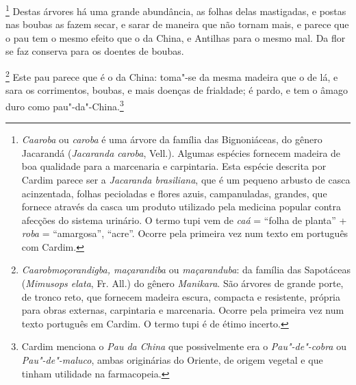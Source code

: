 \begin{linenumbers}
\footnote{ \textit{Caaroba} ou \textit{caroba} é
uma árvore da família das Bignoniáceas, do gênero Jacarandá
(\textit{Jacaranda caroba}, Vell.). Algumas espécies fornecem madeira
de boa qualidade para a marcenaria e carpintaria. Esta espécie descrita
por Cardim parece ser a \textit{Jacaranda brasiliana}, que é um pequeno
arbusto de casca acinzentada, folhas pecioladas e flores azuis,
campanuladas, grandes, que fornece através da casca um produto
utilizado pela medicina popular contra afecções do sistema urinário. O
termo tupi vem de \textit{caá} = ``folha de planta'' + \textit{roba} = ``amargosa'', 
``acre''. Ocorre pela primeira vez num texto em português com
Cardim.} Destas árvores há uma grande abundância, as folhas
delas mastigadas, e postas nas boubas as fazem secar, e sarar de
maneira que não tornam mais, e parece que o pau tem o mesmo efeito que
o da China, e Antilhas para o mesmo mal. Da flor se faz conserva para
os doentes de boubas.

\footnote{ \textit{Caarobmoçorandigba,
maçarandiba} ou \textit{maçaranduba}: da família das Sapotáceas
(\textit{Mimusops elata}, Fr. All.) do gênero \textit{Manikara}. São
árvores de grande porte, de tronco reto, que fornecem madeira escura,
compacta e resistente, própria para obras externas, carpintaria e
marcenaria. Ocorre pela primeira vez num texto português em Cardim. O
termo tupi é de étimo incerto.} Este pau parece
que é o da China: toma"-se da mesma madeira que o de lá, e sara os
corrimentos, boubas, e mais doenças de frialdade; é pardo, e tem o
âmago duro como pau"-da"-China.\footnote{ Cardim menciona o \textit{Pau
da China} que possivelmente era o \textit{Pau"-de"-cobra} ou
\textit{Pau"-de"-maluco}, ambas originárias do Oriente, de origem vegetal
e que tinham utilidade na farmacopeia.} 


\end{linenumbers}
